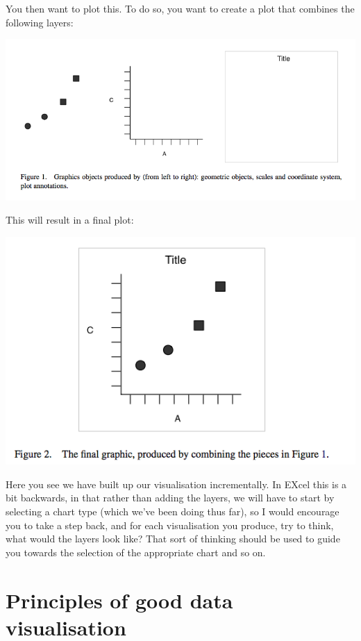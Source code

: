 \documentclass[
]{book}
\begin{document}
You then want to plot this. To do so, you want to create a plot that combines the following layers:

\includegraphics{imgs/layers.png}

This will result in a final plot:

\includegraphics{imgs/combined.png}

Here you see we have built up our visualisation incrementally. In EXcel this is a bit backwards, in that rather than adding the layers, we will have to start by selecting a chart type (which we've been doing thus far), so I would encourage you to take a step back, and for each visualisation you produce, try to think, what would the layers look like? That sort of thinking should be used to guide you towards the selection of the appropriate chart and so on.

\hypertarget{principles-of-good-data-visualisation}{%
\section{Principles of good data visualisation}\label{principles-of-good-data-visualisation}}
\end{document}
